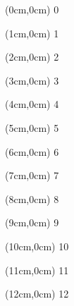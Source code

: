 \documentclass{beamer}
\begin{document}
		
		\begin{frame}
			
	
			\begin{textblock*}{0cm}(0cm,0cm)
				0
			\end{textblock*}
	
			\begin{textblock*}{0cm}(1cm,0cm)
				1
			\end{textblock*}
			\begin{textblock*}{0cm}(2cm,0cm)
				2
			\end{textblock*}
			\begin{textblock*}{0cm}(3cm,0cm)
				3
			\end{textblock*}
			\begin{textblock*}{0cm}(4cm,0cm)
				4
			\end{textblock*}
			\begin{textblock*}{0cm}(5cm,0cm)
				5
			\end{textblock*}
			\begin{textblock*}{0cm}(6cm,0cm)
				6
			\end{textblock*}
			\begin{textblock*}{0cm}(7cm,0cm)
				7
			\end{textblock*}
			\begin{textblock*}{0cm}(8cm,0cm)
				8
			\end{textblock*}
			\begin{textblock*}{0cm}(9cm,0cm)
				9
			\end{textblock*}
			\begin{textblock*}{0cm}(10cm,0cm)
				10
			\end{textblock*}
			\begin{textblock*}{0cm}(11cm,0cm)
				11
			\end{textblock*}
			\begin{textblock*}{0cm}(12cm,0cm)
				12
			\end{textblock*}
	

\end{frame}
\end{document}

